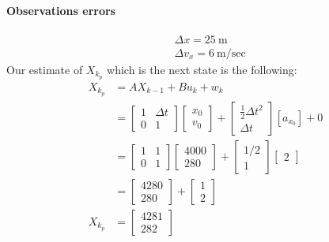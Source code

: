 \paragraph{Observations errors}
$$
\begin{aligned}
&\Delta x=25 \mathrm{~m} \\
&\Delta v_x=6 \mathrm{~m} / \mathrm{sec}
\end{aligned}
$$
Our estimate of $X_{k_p}$ which is the next state is the following:
$$
\begin{aligned}
X_{k_p} &=A X_{k-1}+B u_k+w_k \\
&=\left[\begin{array}{ll}
1 & \Delta t \\
0 & 1
\end{array}\right]\left[\begin{array}{c}
x_0 \\
v_0
\end{array}\right]+\left[\begin{array}{c}
\frac{1}{2} \Delta t^2 \\
\Delta t
\end{array}\right]\left[a_{x_0}\right]+0 \\
&=\left[\begin{array}{ll}
1 & 1 \\
0 & 1
\end{array}\right]\left[\begin{array}{c}
4000 \\
280
\end{array}\right]+\left[\begin{array}{c}
1 / 2 \\
1
\end{array}\right]\left[\begin{array}{l}
2
\end{array}\right] \\
&=\left[\begin{array}{c}
4280 \\
280
\end{array}\right]+\left[\begin{array}{l}
1 \\
2
\end{array}\right] \\
X_{k_p} &=\left[\begin{array}{c}
4281 \\
282
\end{array}\right]
\end{aligned}
$$
